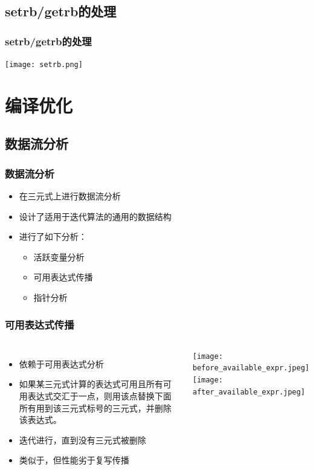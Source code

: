 \documentclass{beamer}
\begin{document}
\subsection{setrb/getrb的处理}
\begin{frame}
\frametitle{setrb/getrb的处理}
\begin{center}
\texttt{[image: setrb.png]}
\end{center}
\end{frame}

\section{编译优化}
\subsection{数据流分析}
\begin{frame}
	\frametitle{数据流分析}
	\noindent
	\begin{itemize}
		\item 在三元式上进行数据流分析
		\item 设计了适用于迭代算法的通用的数据结构
		\item 进行了如下分析：
		\begin{itemize}
			\item 活跃变量分析
			\item \alert{可用表达式传播}
			\item \alert{指针分析}
		\end{itemize}
	\end{itemize}
\end{frame}
\begin{frame}
	\frametitle{可用表达式传播}
	\begin{columns}
		\begin{itemize}
			\item 依赖于可用表达式分析
			\item 如果某三元式计算的表达式可用且所有可用表达式交汇于一点，则用该点替换下面所有用到该三元式标号的三元式，并删除该表达式。
			\item 迭代进行，直到没有三元式被删除
			\item \alert{类似于，但性能劣于复写传播}
		\end{itemize}
		\begin{columns}
			\texttt{[image: before\_available\_expr.jpeg]}
			\texttt{[image: after\_available\_expr.jpeg]}
		\end{columns}
	\end{columns}
\end{frame}
\end{document}
